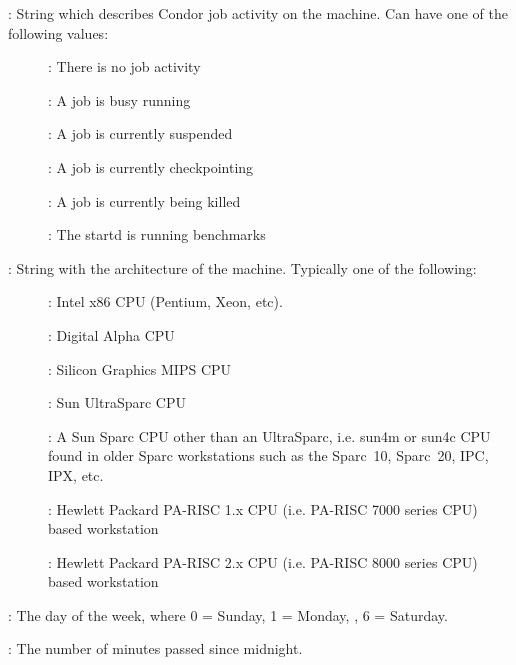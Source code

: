\begin{description}
%
\item[\AdAttr{Activity}] : String which describes Condor job activity on the machine.
Can have one of the following values:
	\begin{description}
	\item[] : There is no job activity
	\item[] : A job is busy running
	\item[] : A job is currently suspended
	\item[] : A job is currently checkpointing
	\item[] : A job is currently being killed
	\item[] : The startd is running benchmarks
	\end{description}
%
\item[\AdAttr{Arch}] : String with the architecture of the machine.  Typically
one of the following: 
	\begin{description}
	\item[] : Intel x86 CPU (Pentium, Xeon, etc).
	\item[] : Digital Alpha CPU
	\item[] : Silicon Graphics MIPS CPU
	\item[] : Sun UltraSparc CPU
	\item[] : A Sun Sparc CPU other than an UltraSparc, i.e.
sun4m or sun4c CPU found in older Sparc workstations such as the Sparc~10, 
Sparc~20, IPC, IPX, etc.
	\item[] :  Hewlett Packard PA-RISC 1.x CPU (i.e. PA-RISC    
                      7000 series CPU) based workstation
	\item[] :  Hewlett Packard PA-RISC 2.x CPU (i.e. PA-RISC    
                      8000 series CPU) based workstation
	\end{description}
%
\item[\AdAttr{ClockDay}] : The day of the week, where 0 = Sunday, 1 = Monday, \Dots, 6 = Saturday. 
%
\item[\AdAttr{ClockMin}] : The number of minutes passed since midnight.
%

\end{description}
